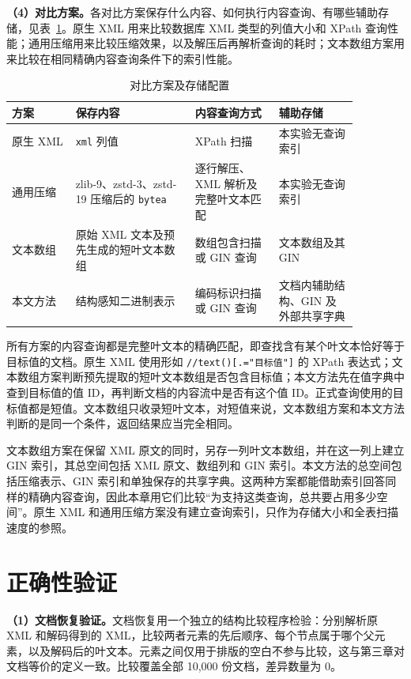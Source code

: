 \textbf{（4）对比方案。}各对比方案保存什么内容、如何执行内容查询、有哪些辅助存储，见表~\ref{tab:exp-baselines}。原生 XML 用来比较数据库 XML 类型的列值大小和 XPath 查询性能；通用压缩用来比较压缩效果，以及解压后再解析查询的耗时；文本数组方案用来比较在相同精确内容查询条件下的索引性能。
\begin{table}[htbp]
\centering\small
\caption{对比方案及存储配置}
\label{tab:exp-baselines}
\begin{tabular}{p{0.16\linewidth}p{0.30\linewidth}p{0.21\linewidth}p{0.20\linewidth}}
\toprule
方案 & 保存内容 & 内容查询方式 & 辅助存储 \\
\midrule
原生 XML & \texttt{xml} 列值 & XPath 扫描 & 本实验无查询索引 \\
通用压缩 & zlib-9、zstd-3、zstd-19 压缩后的 \texttt{bytea} & 逐行解压、XML 解析及完整叶文本匹配 & 本实验无查询索引 \\
文本数组 & 原始 XML 文本及预先生成的短叶文本数组 & 数组包含扫描或 GIN 查询 & 文本数组及其 GIN \\
本文方法 & 结构感知二进制表示 & 编码标识扫描或 GIN 查询 & 文档内辅助结构、GIN 及外部共享字典 \\
\bottomrule
\end{tabular}
\end{table}

所有方案的内容查询都是完整叶文本的精确匹配，即查找含有某个叶文本恰好等于目标值的文档。原生 XML 使用形如 \texttt{//text()[.="目标值"]} 的 XPath 表达式；文本数组方案判断预先提取的短叶文本数组是否包含目标值；本文方法先在值字典中查到目标值的值 ID，再判断文档的内容流中是否有这个值 ID。正式查询使用的目标值都是短值。文本数组只收录短叶文本，对短值来说，文本数组方案和本文方法判断的是同一个条件，返回结果应当完全相同。

文本数组方案在保留 XML 原文的同时，另存一列叶文本数组，并在这一列上建立 GIN 索引，其总空间包括 XML 原文、数组列和 GIN 索引。本文方法的总空间包括压缩表示、GIN 索引和单独保存的共享字典。这两种方案都能借助索引回答同样的精确内容查询，因此本章用它们比较“为支持这类查询，总共要占用多少空间”。原生 XML 和通用压缩方案没有建立查询索引，只作为存储大小和全表扫描速度的参照。

\section{正确性验证}
\textbf{（1）文档恢复验证。}文档恢复用一个独立的结构比较程序检验：分别解析原 XML 和解码得到的 XML，比较两者元素的先后顺序、每个节点属于哪个父元素，以及解码后的叶文本。元素之间仅用于排版的空白不参与比较，这与第三章对文档等价的定义一致。比较覆盖全部 10,000 份文档，差异数量为 0。

